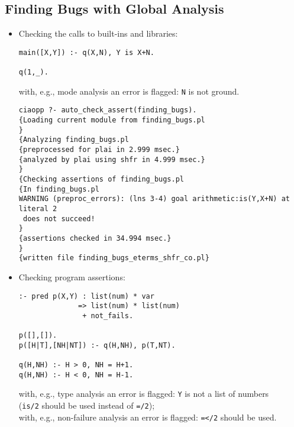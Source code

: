 \documentclass{article}
\renewcommand{\_}{\char'137}
\begin{document}
\subsection{Finding Bugs with Global Analysis}

\begin{itemize}
\item Checking the calls to built-ins and libraries:
\begin{verbatim}
main([X,Y]) :- q(X,N), Y is X+N.

q(1,_).
\end{verbatim}
%
with, e.g.,  mode analysis an error is flagged: \verb+N+ is not ground.

\begin{verbatim}
ciaopp ?- auto_check_assert(finding_bugs).
{Loading current module from finding_bugs.pl
}
{Analyzing finding_bugs.pl
{preprocessed for plai in 2.999 msec.}
{analyzed by plai using shfr in 4.999 msec.}
}
{Checking assertions of finding_bugs.pl
{In finding_bugs.pl
WARNING (preproc_errors): (lns 3-4) goal arithmetic:is(Y,X+N) at literal 2 
 does not succeed!
}
{assertions checked in 34.994 msec.}
}
{written file finding_bugs_eterms_shfr_co.pl}
\end{verbatim}

\item Checking program assertions:
\begin{verbatim}
:- pred p(X,Y) : list(num) * var 
              => list(num) * list(num)
               + not_fails.

p([],[]).
p([H|T],[NH|NT]) :- q(H,NH), p(T,NT).

q(H,NH) :- H > 0, NH = H+1.
q(H,NH) :- H < 0, NH = H-1.
\end{verbatim}
%
with, e.g., type analysis an error is flagged: \verb+Y+ is not a list
of numbers\\ 
({\tt is/2} should be used instead of {\tt =/2});\\ [2mm]
with, e.g., non-failure analysis an error is flagged: {\tt =</2}
should be used.
\end{itemize}
\end{document}
